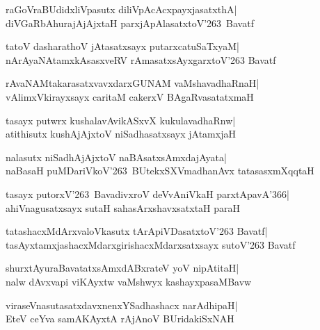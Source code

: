 \documentclass[twoside,12pt,openright]{book}
\newcounter{shloka}[chapter]
\begin{document}
\begin{shloka}%
raGoVraBUdidxliVpasutx diliVpAcAcxpayxjasatxthA|\\
diVGaRbAhurajAjAjxtaH parxjApAlasatxtoV\char'263\ Bavatf
\end{shloka}

\begin{shloka}%
tatoV dasharathoV jAtasatxsayx putarxcatuSaTxyaM|\\
nArAyaNAtamxkAsasxveRV rAmasatxsAyxgarxtoV\char'263 Bavatf
\end{shloka}

\begin{shloka}%
rAvaNAMtakarasatxvavxdarxGUNAM vaMshavadhaRnaH|\\
vAlimxVkirayxsayx caritaM cakerxV BAgaRvasatatxmaH
\end{shloka}

\begin{shloka}%
tasayx putwrx kushalavAvikASxvX kukulavadhaRnw|\\
atithisutx kushAjAjxtoV niSadhasatxsayx jAtamxjaH
\end{shloka}

\begin{shloka}%
nalasutx niSadhAjAjxtoV naBAsatxsAmxdajAyata|\\
naBasaH puMDariVkoV\char'263\ BUtekxSXVmadhanAvx tatasasxmXqqtaH
\end{shloka}

\begin{shloka}%
tasayx putorxV\char'263\ BavadivxroV deVvAniVkaH
parxtApavA\char'366|\\
ahiVnagusatxsayx sutaH sahasArxshavxsatxtaH paraH
\end{shloka}

\begin{shloka}%
tatashacxMdArxvaloVkasutx tArApiVDasatxtoV\char'263 Bavatf|\\
tasAyxtamxjashacxMdarxgirishacxMdarxsatxsayx sutoV\char'263 Bavatf
\end{shloka}

\begin{shloka}%
shurxtAyuraBavatatxsAmxdABxrateV yoV nipAtitaH|\\
nalw dAvxvapi viKAyxtw vaMshwyx kashayxpasaMBavw
\end{shloka}

\begin{shloka}%
viraseVnasutasatxdavxnenxYSadhashacx narAdhipaH|\\
EteV ceYva samAKAyxtA rAjAnoV BUridakiSxNAH
\end{shloka}
\end{document}

